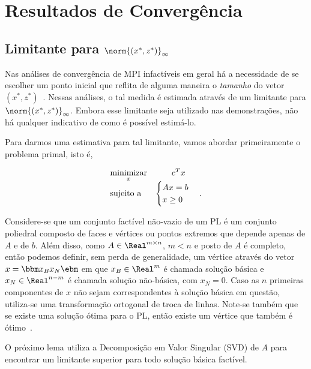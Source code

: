 \chapter{Resultados de Convergência}
\label{chap:convergence}

 \section{Limitante para $\norm{(x^*,z^*)}_\infty$}


Nas análises de convergência de \ac{MPI} infactíveis em geral há  a
necessidade de se escolher um ponto inicial que reflita de alguma maneira o
\emph{tamanho} do vetor $(x^*,z^*)$~\cite{Zhang:2006ic,Wright:1994jd}.
Nessas análises, o tal medida  é estimada através de um
limitante para $\norm{(x^*,z^*)}_\infty$. Embora esse limitante seja utilizado nas
demonstrações, não há qualquer indicativo de como é possível estimá-lo.


Para darmos uma estimativa para tal limitante, vamos abordar primeiramente o
problema primal, isto é,

\begin{equation} %
	\begin{array}{lc}
\displaystyle \minimizar_{x} & c^Tx \\
\text{sujeito a} &\begin{cases} Ax = b \\
				 x \geq 0	
				 \end{cases}.
\end{array}  
\label{eq:primal-bound}
\end{equation}

Considere-se que um conjunto factível não-vazio de um
\ac{PL} é um conjunto poliedral composto de faces e vértices ou pontos
extremos que depende apenas de $A$ e de $b$.  Além disso, como
$A\in\Real^{m\times n}$, $m<n$ e posto de $A$ é completo, então podemos definir,
sem perda de generalidade, um vértice através do vetor $x  = \bbm x _B \\
x _N\ebm$ em que $x _B\in\Real^m$ é chamada solução básica  e
$x _N\in\Real^{n-m}$ é chamada solução não-básica, com $x _N = 0$. Caso as
$n$ primeiras componentes de $x $ não sejam correspondentes à solução básica
em questão, utiliza-se uma transformação ortogonal de troca de linhas.  Note-se
também que se existe uma solução ótima para o \ac{PL}, então existe um vértice que também é ótimo~\cite{Bazaraa:2009uu}.

O próximo lema utiliza a Decomposição em Valor Singular (SVD) de $A$ para
encontrar um limitante superior para todo solução básica factível.



